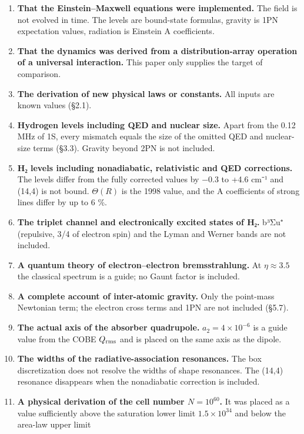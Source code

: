 \documentclass[
  a4paper,
]{article}
\providecommand{\tightlist}{%
  \setlength{\itemsep}{0pt}\setlength{\parskip}{0pt}}
\begin{document}
\begin{enumerate}
\def\labelenumi{\arabic{enumi}.}
\tightlist
\item
  \textbf{That the Einstein--Maxwell equations were implemented.} The
  field is not evolved in time. The levels are bound-state formulas,
  gravity is 1PN expectation values, radiation is Einstein A
  coefficients.
\item
  \textbf{That the dynamics was derived from a distribution-array
  operation of a universal interaction.} This paper only supplies the
  target of comparison.
\item
  \textbf{The derivation of new physical laws or constants.} All inputs
  are known values (§2.1).
\item
  \textbf{Hydrogen levels including QED and nuclear size.} Apart from
  the 0.12 MHz of 1S, every mismatch equals the size of the omitted QED
  and nuclear-size terms (§3.3). Gravity beyond 2PN is not included.
\item
  \textbf{H₂ levels including nonadiabatic, relativistic and QED
  corrections.} The levels differ from the fully corrected values by
  −0.3 to +4.6 cm⁻¹ and (14,4) is not bound. \(\Theta(R)\) is the 1998
  value, and the A coefficients of strong lines differ by up to 6 \%.
\item
  \textbf{The triplet channel and electronically excited states of H₂.}
  b³Σu⁺ (repulsive, 3/4 of electron spin) and the Lyman and Werner bands
  are not included.
\item
  \textbf{A quantum theory of electron--electron bremsstrahlung.} At
  \(\eta\approx3.5\) the classical spectrum is a guide; no Gaunt factor
  is included.
\item
  \textbf{A complete account of inter-atomic gravity.} Only the
  point-mass Newtonian term; the electron cross terms and 1PN are not
  included (§5.7).
\item
  \textbf{The actual axis of the absorber quadrupole.}
  \(a_2=4\times10^{-6}\) is a guide value from the COBE \(Q_{\rm rms}\)
  and is placed on the same axis as the dipole.
\item
  \textbf{The widths of the radiative-association resonances.} The box
  discretization does not resolve the widths of shape resonances. The
  (14,4) resonance disappears when the nonadiabatic correction is
  included.
\item
  \textbf{A physical derivation of the cell number \(N=10^{60}\).} It
  was placed as a value sufficiently above the saturation lower limit
  \(1.5\times10^{34}\) and below the area-law upper limit

\end{enumerate}
\end{document}
